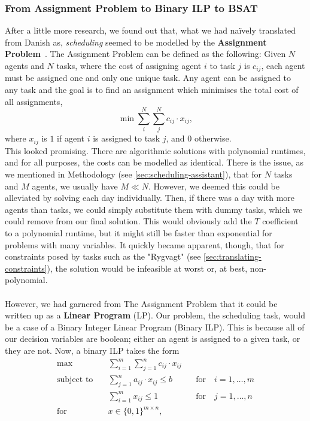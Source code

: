 \subsubsection*{From Assignment Problem to Binary ILP to BSAT}
After a little more research, we found out that, what we had na\"ively translated from Danish as, \emph{scheduling} seemed to be modelled by the \textbf{Assignment Problem}~\cite{Wiki-assignment-prob}. The Assignment Problem can be defined as the following: Given \(N\) agents and \(N\) tasks, where the cost of assigning agent \(i\) to task \(j\) is \(c_{ij}\), each agent must be assigned one and only one unique task. Any agent can be assigned to any task and the goal is to find an assignment which minimises the total cost of all assignments,
\begin{equation*}
    \min \sum_{i}^N \sum_{j}^N c_{ij} \cdot x_{ij},
\end{equation*}
where \(x_{ij}\) is \(1\) if agent \(i\) is assigned to task \(j\), and \(0\) otherwise.
\\
This looked promising. There are algorithmic solutions with polynomial runtimes, and for all purposes, the costs can be modelled as identical. There is the issue, as we mentioned in Methodology (see \autoref{sec:scheduling-assistant}), that for \(N\) tasks and \(M\) agents, we usually have \(M \ll N\). However, we deemed this could be alleviated by solving each day individually. Then, if there was a day with more agents than tasks, we could simply substitute them with dummy tasks, which we could remove from our final solution. This would obviously add the \(T\) coefficient to a polynomial runtime, but it might still be faster than exponential for problems with many variables. It quickly became apparent, though, that for constraints posed by tasks such as the "Rygvagt" (see \autoref{sec:translating-constraints}), the solution would be infeasible at worst or, at best, non-polynomial.
\\
\\
However, we had garnered from The Assignment Problem that it could be written up as a \textbf{Linear Program}\cite{OR-Intro-Book} (LP). Our problem, the scheduling task, would be a case of a Binary Integer Linear Program (Binary ILP). This is because all of our decision variables are boolean; either an agent is assigned to a given task, or they are not.
Now, a binary ILP takes the form\cite{Integer-Programming-Book} 
\begin{equation}\label{eq:binary-ILP}
    \begin{aligned}
    \max \quad &\sum_{i = 1}^m \sum_{j = 1}^n c_{ij} \cdot x_{ij}
    \\
    \text{subject to} \quad &\sum_{j = 1}^n a_{ij} \cdot x_{ij} \leq b \qquad &\text{for} \quad i = 1, \hdots, m
    \\
    &\sum_{i = 1}^m x_{ij} \leq 1 \qquad &\text{for} \quad j = 1, \hdots, n
    \\
    \text{for} \quad &x \in \{0, 1\}^{m \times n},
    \end{aligned}
\end{equation}
